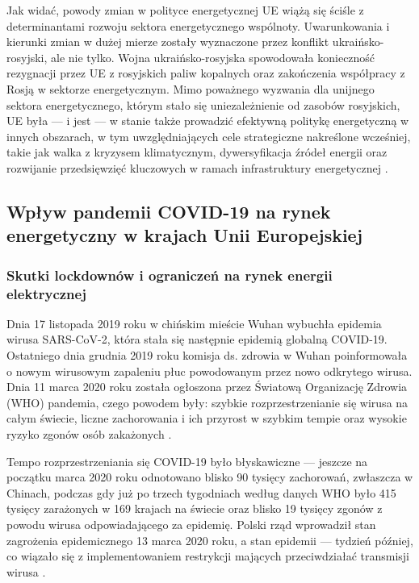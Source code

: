 \documentclass[polish, twoside, 12pt, a4paper]{article}
\theoremstyle{definition}
\theoremstyle{plain}
\theoremstyle{remark}
\begin{document}
Jak widać, powody zmian w polityce energetycznej UE wiążą się ściśle z determinantami rozwoju sektora energetycznego wspólnoty. Uwarunkowania i kierunki zmian w dużej mierze zostały wyznaczone przez konflikt ukraińsko-rosyjski, ale nie tylko. Wojna ukraińsko-rosyjska spowodowała konieczność rezygnacji przez UE z rosyjskich paliw kopalnych oraz zakończenia współpracy z Rosją w sektorze energetycznym. Mimo poważnego wyzwania dla unijnego sektora energetycznego, którym stało się uniezależnienie od zasobów rosyjskich, UE była --- i jest --- w stanie także prowadzić efektywną politykę energetyczną w innych obszarach, w tym uwzględniających cele strategiczne nakreślone wcześniej, takie jak walka z kryzysem klimatycznym, dywersyfikacja źródeł energii oraz rozwijanie przedsięwzięć kluczowych w ramach infrastruktury energetycznej \parencite{ep2023}. 



\subsection{Wpływ pandemii COVID-19 na rynek energetyczny w krajach Unii Europejskiej}
\subsubsection{Skutki lockdownów i ograniczeń na rynek energii elektrycznej}

Dnia 17 listopada 2019 roku w chińskim mieście Wuhan wybuchła epidemia wirusa SARS-CoV-2, która stała się następnie epidemią globalną COVID-19. Ostatniego dnia grudnia 2019 roku komisja ds. zdrowia w Wuhan poinformowała o nowym wirusowym zapaleniu płuc powodowanym przez nowo odkrytego wirusa. Dnia 11  marca  2020  roku  została  ogłoszona przez Światową Organizację Zdrowia (WHO) pandemia, czego powodem były: szybkie rozprzestrzenianie się wirusa na całym świecie, liczne zachorowania i ich przyrost w szybkim tempie oraz wysokie ryzyko zgonów osób zakażonych \parencite{gorska2023}.

Tempo rozprzestrzeniania się COVID-19 było błyskawiczne --- jeszcze na początku marca 2020 roku odnotowano blisko 90 tysięcy zachorowań, zwłaszcza w Chinach, podczas gdy już po trzech tygodniach według danych WHO było 415 tysięcy zarażonych w 169 krajach na świecie oraz blisko 19 tysięcy zgonów z powodu wirusa odpowiadającego za epidemię. Polski rząd wprowadził stan zagrożenia epidemicznego 13 marca 2020 roku, a stan epidemii --- tydzień później, co wiązało się z implementowaniem restrykcji mających przeciwdziałać transmisji wirusa \parencite{wajer2023}. 
\end{document}

